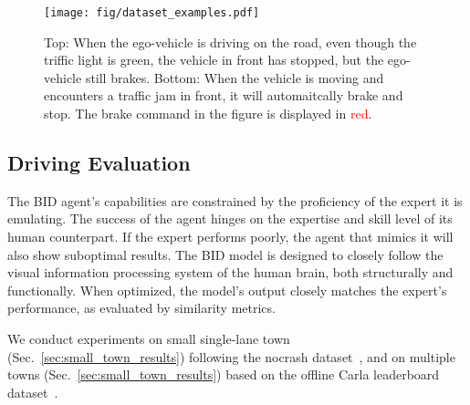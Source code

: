 \begin{figure}[t]
	\centering
	\texttt{[image: fig/dataset\_examples.pdf]}
	\caption{Top: When the ego-vehicle is driving on the road, even though the triffic light is green, the vehicle in front has stopped, but the ego-vehicle still brakes.
		Bottom: When the vehicle is moving and encounters a traffic jam in front, it will automaitcally brake and stop.
		The brake command in the figure is displayed in \textcolor{red}{red}.}
	\label{fig:command_ambiguous}
\end{figure}

\subsection{Driving Evaluation}
\label{sec:Metrics}
\hspace{1pc}The BID agent's capabilities are constrained by the proficiency of the expert it is emulating. 
The success of the agent hinges on the expertise and skill level of its human counterpart.
If the expert performs poorly, the agent that mimics it will also show suboptimal results. 
The BID model is designed to closely follow the visual information processing system of the human brain, both structurally and functionally. 
When optimized, the model's output closely matches the expert's performance, as evaluated by similarity metrics.


We conduct experiments on small single-lane town (Sec.~\ref{sec:small_town_results}) following the nocrash dataset~\cite{Zhang:2021,Hu:2022}, and on multiple towns (Sec.~\ref{sec:small_town_results}) based on the offline Carla leaderboard dataset~\cite{Zhang:2021,Hu:2022}. 


